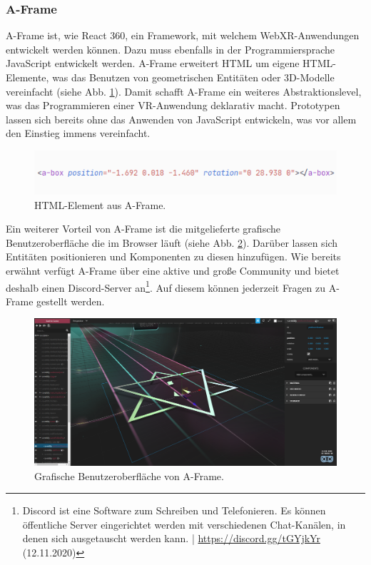 \documentclass[a4paper,12pt,oneside]{article}
\begin{document}
      \subsubsection{A-Frame}
        A-Frame ist, wie React 360, ein Framework, mit welchem WebXR-Anwendungen
        entwickelt werden können. Dazu muss ebenfalls in der Programmiersprache 
        JavaScript entwickelt werden. A-Frame erweitert HTML um eigene 
        HTML-Elemente, was das Benutzen von geometrischen Entitäten oder 3D-Modelle
        vereinfacht (siehe Abb. \ref{fig:aframe1}). Damit schafft A-Frame ein 
        weiteres Abstraktionslevel, was das Programmieren einer VR-Anwendung 
        deklarativ macht. Prototypen lassen sich bereits ohne das Anwenden von 
        JavaScript entwickeln, was vor allem den Einstieg immens vereinfacht.
        \begin{figure}[h]
          \centering
          \includegraphics{img/aframe1.png}
          \caption{HTML-Element aus A-Frame.}
          \label{fig:aframe1}
        \end{figure}
        Ein weiterer Vorteil von A-Frame ist die mitgelieferte grafische 
        Benutzeroberfläche die im Browser läuft (siehe Abb. \ref{fig:aframe1-gui}).
        Darüber lassen sich Entitäten positionieren und Komponenten zu diesen 
        hinzufügen. Wie bereits erwähnt verfügt A-Frame über eine aktive und große
        Community und bietet deshalb einen Discord-Server an\footnote{Discord ist eine Software zum Schreiben und Telefonieren. Es können öffentliche Server eingerichtet werden mit verschiedenen Chat-Kanälen, in denen sich ausgetauscht werden kann. | \url{https://discord.gg/tGYjkYr} (12.11.2020)}.
        Auf diesem können jederzeit Fragen zu A-Frame gestellt werden.
        \begin{figure}[h]
          \centering
          \includegraphics[scale=0.3]{img/aframe-editor.png}
          \caption{Grafische Benutzeroberfläche von A-Frame.}
          \label{fig:aframe1-gui}
        \end{figure}
\end{document}
